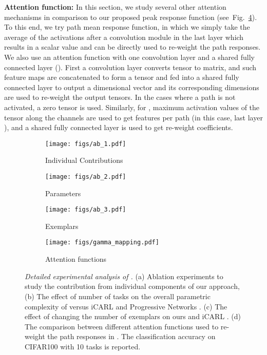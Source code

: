 \textbf{Attention function:} In this section, we study several other attention mechanisms in comparison to our proposed peak response function (see~Fig.~\ref{fig:gamma_mapping}). To this end, we try path mean response function, in which we simply take the average of the activations after a convolution module in the last layer which results in a scalar value and can be directly used to re-weight the path responses. We also use an attention function with one convolution layer and a shared fully connected layer (). First a convolution layer  converts  tensor to  matrix, and  such feature maps are concatenated to form a  tensor and fed into a shared fully connected layer to output a  dimensional vector and its corresponding dimensions are used to re-weight the  output tensors. In the cases where a path is not activated, a zero tensor is used. Similarly, for , maximum activation values of the tensor along the channels are used to get  features per path (in this case, last layer ), and a shared fully connected layer is used to get  re-weight coefficients.


\begin{figure*}
    \centering
    \begin{subfigure}{.245\textwidth}
        \centering
        \texttt{[image: figs/ab\_1.pdf]}
        \caption{Individual Contributions}\label{fig:indv_contrib}
    \end{subfigure}
    \begin{subfigure}{.245\textwidth}
        \centering
        \texttt{[image: figs/ab\_2.pdf]}
        \caption{Parameters}\label{fig:params}
    \end{subfigure}
    \begin{subfigure}{.245\textwidth}
        \texttt{[image: figs/ab\_3.pdf]}
        \caption{Exemplars}\label{fig:exemplars}
    \end{subfigure}
    \begin{subfigure}{.245\textwidth}
        \texttt{[image: figs/gamma\_mapping.pdf]}
        \caption{Attention functions}\label{fig:gamma_mapping} 
    \end{subfigure}
    \caption{\emph{Detailed experimental analysis of \ours{}.} (a) Ablation experiments to study the contribution from individual components of our approach, (b) The effect of number of tasks on the overall parametric complexity of \ours{} versus iCARL \cite{rebuffi2017icarl} and Progressive Networks \cite{rusu2016progressive}. (c) The effect of changing the number of exemplars on ours and iCARL \cite{rebuffi2017icarl}. (d) The comparison between different attention functions used to re-weight the path responses in \ours{}. The classification accuracy on CIFAR100 with 10 tasks is reported. }
    \label{fig:analysis}
\end{figure*}


